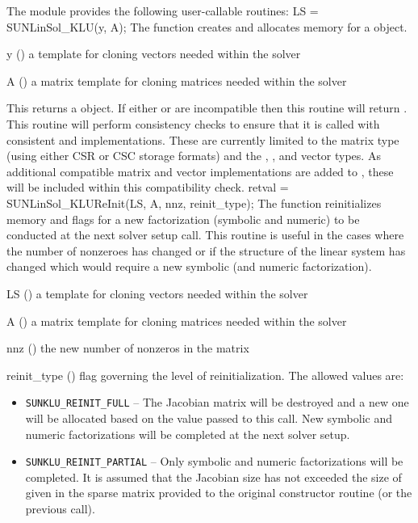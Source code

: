 The module {\sunlinsolklu} provides the following user-callable routines: 
{
  LS = SUNLinSol\_KLU(y, A);
}
{
  The function  creates and allocates memory for a
  {\sunlinsolklu} object.
}
{
  \begin{args}[y]
  \item[y] ()
    a template for cloning vectors needed within the solver
  \item[A] ()
    a {\sunmatsparse} matrix template for cloning matrices needed
    within the solver 
  \end{args}
}
{
  This returns a  object.  If either  or
   are incompatible then this routine will return .
}
{
  This routine will perform consistency checks to ensure that it is
  called with consistent {\nvector} and {\sunmatrix} implementations.
  These are currently limited to the {\sunmatsparse} matrix type
  (using either CSR or CSC storage formats) and the {\nvecs},
  {\nvecopenmp}, and {\nvecpthreads} vector types.  As additional
  compatible matrix and vector implementations are added to
  {\sundials}, these will be included within this compatibility
  check. 
}
{
  retval = SUNLinSol\_KLUReInit(LS, A, nnz, reinit\_type);
}
{
  The function  reinitializes memory and
  flags for a new factorization (symbolic and numeric) to be conducted
  at the next solver setup call.  This routine is useful in the cases
  where the number of nonzeroes has changed or if the structure of the
  linear system has changed which would require a new symbolic (and
  numeric factorization). 
}
{
  \begin{args}
  \item[LS] ()
    a template for cloning vectors needed within the solver
  \item[A] ()
    a {\sunmatsparse} matrix template for cloning matrices needed
    within the solver 
  \item[nnz] ()
    the new number of nonzeros in the matrix
  \item[reinit\_type] ()
    flag governing the level of reinitialization.  The allowed values
    are:
    \begin{itemize}
    \item \texttt{SUNKLU\_REINIT\_FULL} -- The Jacobian matrix will be
      destroyed and a new one will be allocated based on the 
      value passed to this call.  New symbolic and numeric
      factorizations will be completed at the next solver setup. 
    \item \texttt{SUNKLU\_REINIT\_PARTIAL} -- Only symbolic and numeric 
      factorizations will be completed.  It is assumed that the
      Jacobian size has not exceeded the size of  given in the
      sparse matrix provided to the original constructor routine (or
      the previous  call). 
    \end{itemize}
  \end{args}
}
